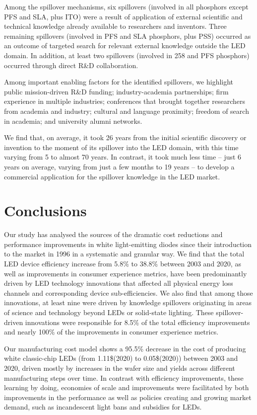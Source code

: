 \documentclass[journal=jacsat,manuscript=article]{achemso}
\begin{document}
Among the spillover mechanisms, six spillovers (involved in all phosphors except PFS and SLA, plus ITO) were a result of application of external scientific and technical knowledge already available to researchers and inventors. Three remaining spillovers (involved in PFS and SLA phosphors, plus PSS) occurred as an outcome of targeted search for relevant external knowledge outside the LED domain. In addition, at least two spillovers (involved in 258 and PFS phosphors) occurred through direct R\&D collaboration.

Among important enabling factors for the identified spillovers, we highlight public mission-driven R\&D funding; industry-academia partnerships; firm experience in multiple industries; conferences that brought together researchers from academia and industry; cultural and language proximity; freedom of search in academia; and university alumni networks.

We find that, on average, it took 26 years from the initial scientific discovery or invention to the moment of its spillover into the LED domain, with this time varying from 5 to almost 70 years. In contrast, it took much less time – just 6 years on average, varying from just a few months to 19 years – to develop a commercial application for the spillover knowledge in the LED market. 

\section{Conclusions}

Our study has analysed the sources of the dramatic cost reductions and performance improvements in white light-emitting diodes since their introduction to the market in 1996 in a systematic and granular way. We find that the total LED device efficiency increase from 5.8\% to 38.8\% between 2003 and 2020, as well as improvements in consumer experience metrics, have been predominantly driven by LED technology innovations that affected all physical energy loss channels and corresponding device sub-efficiencies. We also find that among those innovations, at least nine were driven by knowledge spillovers originating in areas of science and technology beyond LEDs or solid-state lighting. These spillover-driven innovations were responsible for 8.5\% of the total efficiency improvements and nearly 100\% of the improvements in consumer experience metrics. 

Our manufacturing cost model shows a 95.5\% decrease in the cost of producing white classic-chip LEDs (from 1.11\$(2020) to 0.05\$(2020)) between 2003 and 2020, driven mostly by increases in the wafer size and yields across different manufacturing steps over time. In contrast with efficiency improvements, these learning by doing, economies of scale and improvements were facilitated by both improvements in the performance as well as policies creating and growing market demand, such as incandescent light bans and subsidies for LEDs.
\end{document}
